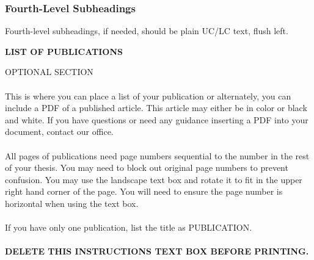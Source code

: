 \documentclass[a4paper,12pt,one side]{report}
\theoremstyle{definition}
\begin{document}
\begin{justify}
\begin{appendix}
\subsubsection{Fourth-Level Subheadings}
Fourth-level subheadings, if needed, should be plain UC/LC text, flush left. 
\end{appendix} 
\newpage
{}
\begin{center}
\textbf {LIST OF PUBLICATIONS}
\end{center}
\begin{tcolorbox}[enhanced jigsaw,
    sharp corners,
    boxrule=0.5pt, 
    colback=blue!30!white,   
    borderline={0.5pt}{-2pt}{black,solid} %
 ]
 \begin{justify}
OPTIONAL SECTION\\~\\
This is where you can place a list of your publication or alternately, you can include a PDF of a published article. This article may either be in color or black and white. If you have questions or need any guidance inserting a PDF into your document, contact our office.\\~\\
All pages of publications need page numbers sequential to the number in the rest of your thesis. You may need to block out original page numbers to prevent confusion. You may use the landscape text box and rotate it to fit in the upper right hand corner of the page. You will need to ensure the page number is horizontal when using the text box.\\~\\
If you have only one publication, list the title as PUBLICATION.\\~\\
\bf{DELETE THIS INSTRUCTIONS TEXT BOX BEFORE PRINTING.}
\end{justify}
\end{tcolorbox}
\end{justify}
\end{document}
